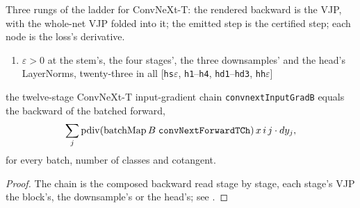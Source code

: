 Three rungs of the ladder for ConvNeXt-T: the rendered backward is the
VJP, with the whole-net VJP folded into it; the emitted step is the
certified step; each node is the loss's derivative.

\begin{theorem}
  \label{thm:convnext_whole_back}
  \leanok
  \Assume{}
  \begin{enumerate}
    \item \(\varepsilon > 0\) at the stem's, the four stages', the three
          downsamples' and the head's LayerNorms, twenty-three in all
          \hfill[\texttt{hs\(\varepsilon\)}, \texttt{h1}--\texttt{h4}, \texttt{hd1}--\texttt{hd3}, \texttt{hh\(\varepsilon\)}]
  \end{enumerate}
  \Prove{} the twelve-stage ConvNeXt-T input-gradient chain
  \texttt{convnextInputGradB} equals the backward of the batched forward,
  \[
    \sum_j \operatorname{pdiv}(\mathrm{batchMap}\, B\; \texttt{convNextForwardTCh})\, x\, i\, j
  \cdot dy_j ,
  \]
  for every batch, number of classes and cotangent.
\end{theorem}

\begin{proof}
\leanok
The chain is the composed backward read stage by stage, each stage's VJP
the block's, the downsample's or the head's; see
.
\end{proof}

